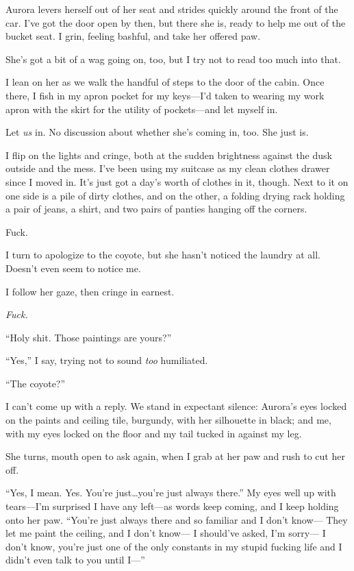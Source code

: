 Aurora levers herself out of her seat and strides quickly around the front of the car. I've got the door open by then, but there she is, ready to help me out of the bucket seat. I grin, feeling bashful, and take her offered paw.

She's got a bit of a wag going on, too, but I try not to read too much into that.

I lean on her as we walk the handful of steps to the door of the cabin. Once there, I fish in my apron pocket for my keys---I'd taken to wearing my work apron with the skirt for the utility of pockets---and let myself in.

Let \emph{us} in. No discussion about whether she's coming in, too. She just is.

I flip on the lights and cringe, both at the sudden brightness against the dusk outside and the mess. I've been using my suitcase as my clean clothes drawer since I moved in. It's just got a day's worth of clothes in it, though. Next to it on one side is a pile of dirty clothes, and on the other, a folding drying rack holding a pair of jeans, a shirt, and two pairs of panties hanging off the corners.

Fuck.

I turn to apologize to the coyote, but she hasn't noticed the laundry at all. Doesn't even seem to notice me.

I follow her gaze, then cringe in earnest.

\emph{Fuck.}

``Holy shit. Those paintings are yours?''

``Yes,'' I say, trying not to sound \emph{too} humiliated.

``The coyote?''

I can't come up with a reply. We stand in expectant silence: Aurora's eyes locked on the paints and ceiling tile, burgundy, with her silhouette in black; and me, with my eyes locked on the floor and my tail tucked in against my leg.

She turns, mouth open to ask again, when I grab at her paw and rush to cut her off.

``Yes, I mean. Yes. You're just\ldots{}you're just always there.'' My eyes well up with tears---I'm surprised I have any left---as words keep coming, and I keep holding onto her paw. ``You're just always there and so familiar and I don't know--- They let me paint the ceiling, and I don't know--- I should've asked, I'm sorry--- I don't know, you're just one of the only constants in my stupid fucking life and I didn't even talk to you until I---''

